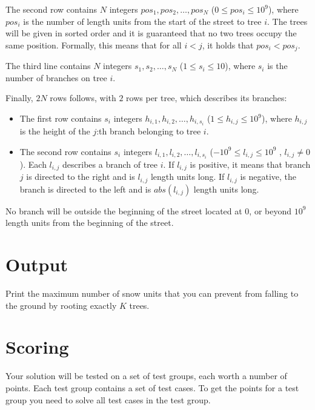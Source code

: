 The second row contains $N$ integers $pos_1, pos_2, \dots, pos_N$ ($0 \leq pos_i \leq 10^9$), where
$pos_i$ is the number of length units from the start of the street to tree $i$.
The trees will be given in sorted order and it is guaranteed that no two trees occupy the same position.
Formally, this means that for all $i<j$, it holds that $pos_i < pos_j$.

The third line contains $N$ integers $s_1, s_2, \dots, s_N$ ($1 \leq s_i \leq 10$), where $s_i$ is the
number of branches on tree $i$.

Finally, $2N$ rows follows, with $2$ rows per tree, which describes its branches:
\begin{itemize}
  \item The first row contains $s_i$ integers $h_{i,1}, h_{i,2}, \dots, h_{i,s_i}$ ($1 \leq h_{i,j} \leq 10^9$), where $h_{i,j}$ is the height of the $j$:th branch belonging to tree $i$.
  \item The second row contains $s_i$ integers $l_{i,1}, l_{i,2}, \dots, l_{i,s_i}$ ($-10^9 \leq l_{i,j} \leq 10^9$ , $l_{i,j} \neq 0$). 
  Each $l_{i,j}$ describes a branch of tree $i$. If $l_{i,j}$ is positive, it means that branch $j$ is directed to the right and is $l_{i,j}$ length units long. 
  If $l_{i,j}$ is negative, the branch is directed to the left and is $abs(l_{i,j})$ length units long.
\end{itemize}

No branch will be outside the beginning of the street located at $0$, or beyond $10^9$ length units from the beginning of the street.

\section*{Output}
\noindent
Print the maximum number of snow units that you can prevent from falling to the ground by rooting exactly $K$ trees.

\section*{Scoring}
Your solution will be tested on a set of test groups, each worth a number of points. 
Each test group contains a set of test cases. 
To get the points for a test group you need to solve all test cases in the test group.


